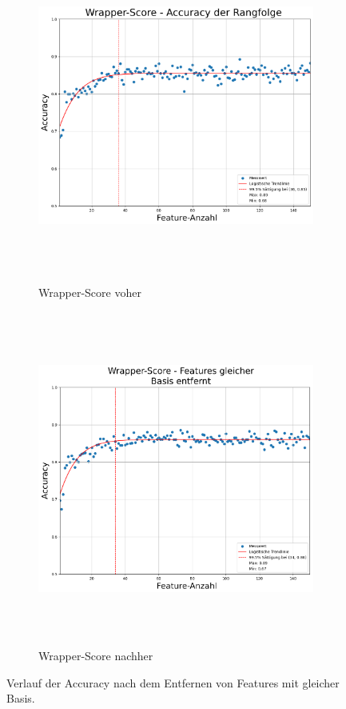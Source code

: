 \begin{figure}[hp]
     \centering
     \begin{subfigure}[b]{0.9\textwidth}
         \centering
         \includegraphics[width=\textwidth, height=11cm]{img/Plots/Feature Auswahl/Wrapper-Score.png}
         \caption{Wrapper-Score voher}
     \end{subfigure}
     \hfill
     \begin{subfigure}[b]{0.9\textwidth}
         \centering
         \includegraphics[width=\textwidth, height=11cm]{img/Plots/Feature Auswahl/Wrapper-Score mit Entfernen.png}
         \caption{Wrapper-Score nachher}
     \end{subfigure}
     \caption{Verlauf der Accuracy nach dem Entfernen von Features mit gleicher Basis.}
     \label{fig:plotRIPsame Bais Wrap}
\end{figure}

